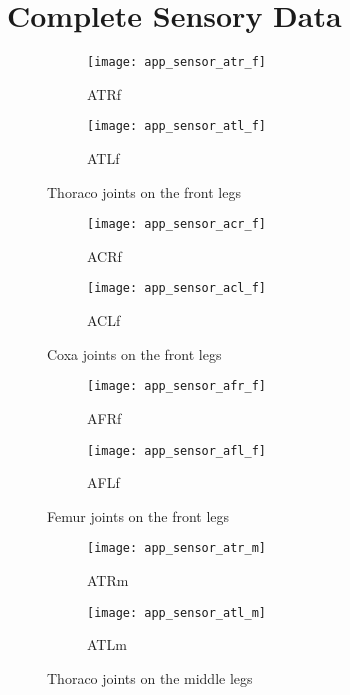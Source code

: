 \section{Complete Sensory Data} \label{sec:complete_sensory_data}

\begin{figure}[H]
\centering
\begin{subfigure}{0.48\textwidth}
  \centering
  \texttt{[image: app\_sensor\_atr\_f]}
  \caption{ATRf}
  \label{fig:app_atr_f}
\end{subfigure}
\begin{subfigure}{0.48\textwidth}
  \centering
  \texttt{[image: app\_sensor\_atl\_f]}
  \caption{ATLf}
  \label{fig:app_atl_f}
\end{subfigure}
\caption{Thoraco joints on the front legs}
\label{fig:app_at_f}
\end{figure}

\begin{figure}[H]
\centering
\begin{subfigure}{0.48\textwidth}
  \centering
  \texttt{[image: app\_sensor\_acr\_f]}
  \caption{ACRf}
  \label{fig:app_acr_f}
\end{subfigure}
\begin{subfigure}{0.48\textwidth}
  \centering
  \texttt{[image: app\_sensor\_acl\_f]}
  \caption{ACLf}
  \label{fig:app_acl_f}
\end{subfigure}
\caption{Coxa joints on the front legs}
\label{fig:app_ac_f}
\end{figure}

\begin{figure}[H]
\centering
\begin{subfigure}{0.48\textwidth}
  \centering
  \texttt{[image: app\_sensor\_afr\_f]}
  \caption{AFRf}
  \label{fig:app_afr_f}
\end{subfigure}
\begin{subfigure}{0.48\textwidth}
  \centering
  \texttt{[image: app\_sensor\_afl\_f]}
  \caption{AFLf}
  \label{fig:app_afl_f}
\end{subfigure}
\caption{Femur joints on the front legs}
\label{fig:app_af_f}
\end{figure}

\begin{figure}[H]
\centering
\begin{subfigure}{0.48\textwidth}
  \centering
  \texttt{[image: app\_sensor\_atr\_m]}
  \caption{ATRm}
  \label{fig:app_atr_m}
\end{subfigure}
\begin{subfigure}{0.48\textwidth}
  \centering
  \texttt{[image: app\_sensor\_atl\_m]}
  \caption{ATLm}
  \label{fig:app_atl_m}
\end{subfigure}
\caption{Thoraco joints on the middle legs}
\label{fig:app_at_m}
\end{figure}

